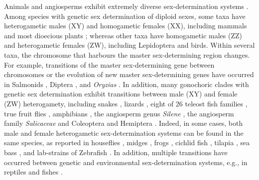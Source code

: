 \documentclass[12pt]{article}
\begin{document}
Animals and angiosperms exhibit extremely diverse sex-determination systems \citep[reviewed in][]{Bull:1983vi,Charlesworth:2010it,Beukeboom:2014vb,Bachtrog:2014bx}. 
Among species with genetic sex determination of diploid sexes, some taxa have heterogametic males (XY) and homogametic females (XX), including %
mammals and most dioecious plants \citep{Ming:2011iy}; whereas other taxa have homogametic males (ZZ) and heterogametic females (ZW), including Lepidoptera and birds. 
Within several taxa, the chromosome that harbours the master sex-determining region changes. 
For example, transitions of the master sex-determining gene between chromosomes or the evolution of new master sex-determining genes have occurred in Salmonids \citep{Li:2011fm,Yano:2012di}, Diptera \citep{Vicoso:2015hf}, and \textit{Oryzias} \citep{Myosho:2012fv}.
In addition, many gonochoric clades with genetic sex determination exhibit transitions between male (XY) and female (ZW) heterogamety, including snakes \citep{Gamble2017}, lizards \citep{Ezaz:2009tk}, eight of 26 teleost fish families \citep{Mank:2006bt}, true fruit flies \citep[Tephritids,][]{Vicoso:2015hf}, amphibians \citep{Hillis:1990gu}, the angiosperm genus \textit{Silene} \citep{Slancarova:2013dq}, the angiosperm family \textit{Salicaceae} \citep{Pucholt2015,Pucholt2017} and Coleoptera and Hemiptera \citep[][plate 2]{Beukeboom:2014vb}.
Indeed, in some cases, both male and female heterogametic sex-determination systems can be found in the same species, as reported in houseflies \citep{Macdonald1978}, midges \citep{Thompson1971}, frogs \citep{Ogata:2007jm}, cichlid fish \citep{Ser:2010iq}, tilapia \citep{Lee2004}, sea bass \citep{Vandeputte2007}, and lab-strains of Zebrafish \citep{Liew2012,Wilson2014}.
In addition, multiple transitions have occurred between genetic and environmental sex-determination systems, e.g., in reptiles and fishes \citep{Conover:1987in,Mank:2006bt,Pokorna:2009ui,Ezaz:2009tk,Pen:2010kk,Holleley:2015hc}.

\end{document}
